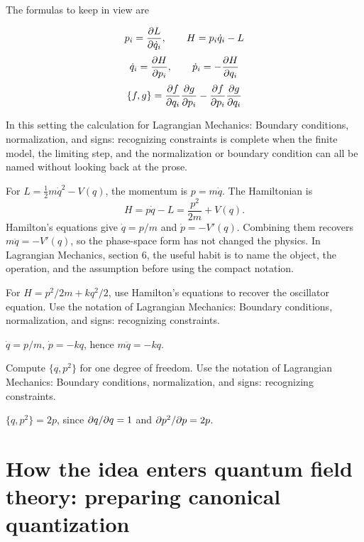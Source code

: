 The formulas to keep in view are

\[
  p_i=\frac{\partial L}{\partial\dot q_i},\qquad H=p_i\dot q_i-L
\]
\[
  \dot q_i=\frac{\partial H}{\partial p_i},\qquad \dot p_i=-\frac{\partial H}{\partial q_i}
\]
\[
  \{f,g\}=\frac{\partial f}{\partial q_i}\frac{\partial g}{\partial p_i}-\frac{\partial f}{\partial p_i}\frac{\partial g}{\partial q_i}
\]

In this setting the calculation for Lagrangian Mechanics: Boundary conditions, normalization, and signs: recognizing constraints is complete when the finite model, the limiting step, and the normalization or boundary condition can all be named without looking back at the prose.




\begin{example}
For \(L=\frac12m\dot q^2-V(q)\), the momentum is \(p=m\dot q\).  The Hamiltonian is
\[
  H=p\dot q-L=\frac{p^2}{2m}+V(q).
\]
Hamilton's equations give \(\dot q=p/m\) and \(\dot p=-V'(q)\).  Combining them recovers \(m\ddot q=-V'(q)\), so the phase-space form has not changed the physics.  In Lagrangian Mechanics, section 6, the useful habit is to name the object, the operation, and the assumption before using the compact notation.
\end{example}



\begin{exercise}
For \(H=p^2/2m+kq^2/2\), use Hamilton's equations to recover the oscillator equation.  Use the notation of Lagrangian Mechanics: Boundary conditions, normalization, and signs: recognizing constraints.
\begin{answer}
\(\dot q=p/m\), \(\dot p=-kq\), hence \(m\ddot q=-kq\).
\end{answer}
\end{exercise}

\begin{exercise}
Compute \(\{q,p^2\}\) for one degree of freedom.  Use the notation of Lagrangian Mechanics: Boundary conditions, normalization, and signs: recognizing constraints.
\begin{answer}
\(\{q,p^2\}=2p\), since \(\partial q/\partial q=1\) and \(\partial p^2/\partial p=2p\).
\end{answer}
\end{exercise}



\section{How the idea enters quantum field theory: preparing canonical quantization}

